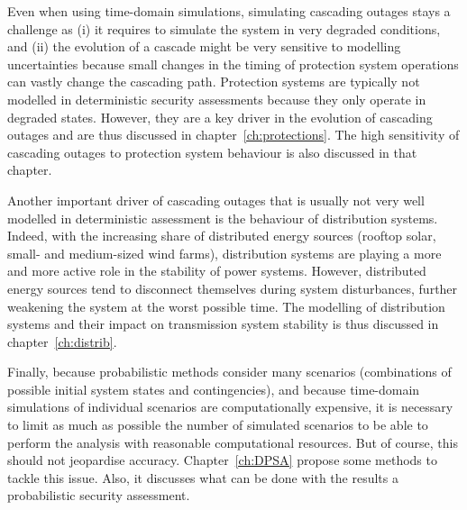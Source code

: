 Even when using time-domain simulations, simulating cascading outages stays a challenge as (i) it requires to simulate the system in very degraded conditions, and (ii) the evolution of a cascade might be very sensitive to modelling uncertainties because small changes in the timing of protection system operations can vastly change the cascading path. Protection systems are typically not modelled in deterministic security assessments because they only operate in degraded states. However, they are a key driver in the evolution of cascading outages and are thus discussed in chapter~\ref{ch:protections}. The high sensitivity of cascading outages to protection system behaviour is also discussed in that chapter. %

Another important driver of cascading outages that is usually not very well modelled in deterministic assessment is the behaviour of distribution systems. Indeed, with the increasing share of distributed energy sources (rooftop solar, small- and medium-sized wind farms), distribution systems are playing a more and more active role in the stability of power systems. However, distributed energy sources tend to disconnect themselves during system disturbances, further weakening the system at the worst possible time. The modelling of distribution systems and their impact on transmission system stability is thus discussed in chapter~\ref{ch:distrib}.

Finally, because probabilistic methods consider many scenarios (combinations of possible initial system states and contingencies), and because time-domain simulations of individual scenarios are computationally expensive, it is necessary to limit as much as possible the number of simulated scenarios to be able to perform the analysis with reasonable computational resources. But of course, this should not jeopardise accuracy. Chapter~\ref{ch:DPSA} propose some methods to tackle this issue. Also, it discusses what can be done with the results a probabilistic security assessment.
